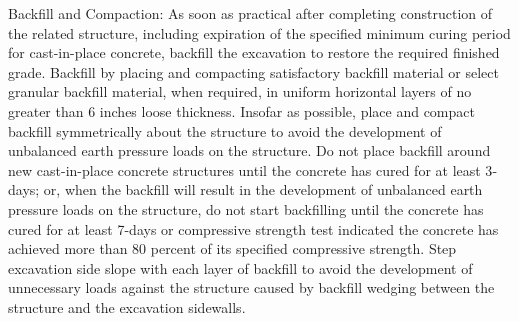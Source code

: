 \documentclass{article}%
\begin{document}
\begin{enumerate}[label=\alph*),start=1]
Backfill and Compaction: As soon as practical after completing construction of the related structure, including expiration of the specified minimum curing period for cast{-}in{-}place concrete, backfill the excavation to restore the required finished grade. Backfill by placing and compacting satisfactory backfill material or select granular backfill material, when required, in uniform horizontal layers of no greater than 6 inches loose thickness. Insofar as possible, place and compact backfill symmetrically about the structure to avoid the development of unbalanced earth pressure loads on the structure. Do not place backfill around new cast{-}in{-}place concrete structures until the concrete has cured for at least 3{-}days; or, when the backfill will result in the development of unbalanced earth pressure loads on the structure, do not start backfilling until the concrete has cured for at least 7{-}days or compressive strength test indicated the concrete has achieved more than 80 percent of its specified compressive strength. Step excavation side slope with each layer of backfill to avoid the development of unnecessary loads against the structure caused by backfill wedging between the structure and the excavation sidewalls.%
\end{enumerate}

%
\end{document}
